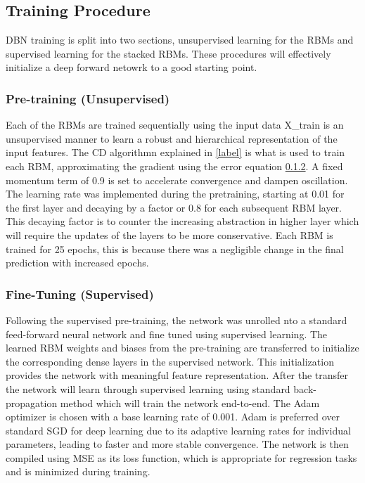 \subsection{Training Procedure}
 DBN training is split into two sections, unsupervised learning for the RBMs and supervised learning for the stacked RBMs. These procedures will effectively initialize a deep forward netowrk to a good starting point.
 \subsubsection{Pre-training (Unsupervised)}Each of the RBMs are trained sequentially using the input data X\_train is an unsupervised manner to learn a robust and hierarchical representation of the input features. The CD algorithmn explained in \ref{label} is what is used to train each RBM, approximating the gradient using the error equation \ref{}. A fixed momentum term of 0.9 is set to accelerate convergence and dampen oscillation.\\ The learning rate was implemented during the pretraining, starting at 0.01 for the first layer and decaying by a factor or 0.8 for each subsequent RBM layer. This decaying factor is to counter the increasing abstraction in higher layer which will require the updates of the layers to be more conservative. Each RBM is trained for 25 epochs, this is because there was a negligible change in the final prediction with increased epochs.
 
 \subsubsection{Fine-Tuning (Supervised)} Following the supervised pre-training, the network was unrolled nto a standard feed-forward neural network and fine tuned using supervised learning. The learned RBM weights and biases from the pre-training are transferred to initialize the corresponding dense layers in the supervised network. This initialization provides the network with meaningful feature representation. After the transfer the network will learn through supervised learning using standard back-propagation method which will train the network end-to-end.
 The Adam optimizer is chosen with a base learning rate of 0.001. Adam is preferred over standard SGD for deep learning due to its adaptive learning rates for individual parameters, leading to faster and more stable convergence. The network is then compiled using MSE as its loss function, which is appropriate for regression tasks and is minimized during training.
 

